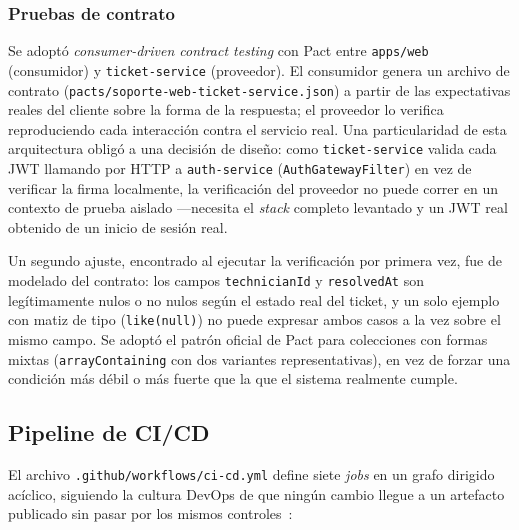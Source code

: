 \subsubsection{Pruebas de contrato}

Se adoptó \emph{consumer-driven contract testing} con Pact entre \texttt{apps/web} (consumidor) y
\texttt{ticket-service} (proveedor). El consumidor genera un archivo de contrato
(\texttt{pacts/soporte-web-ticket-service.json}) a partir de las expectativas reales del cliente
sobre la forma de la respuesta; el proveedor lo verifica reproduciendo cada interacción contra el
servicio real. Una particularidad de esta arquitectura obligó a una decisión de diseño: como
\texttt{ticket-service} valida cada JWT llamando por HTTP a \texttt{auth-service}
(\texttt{AuthGatewayFilter}) en vez de verificar la firma localmente, la verificación del
proveedor no puede correr en un contexto de prueba aislado —necesita el \emph{stack} completo
levantado y un JWT real obtenido de un inicio de sesión real.

Un segundo ajuste, encontrado al ejecutar la verificación por primera vez, fue de modelado del
contrato: los campos \texttt{technicianId} y \texttt{resolvedAt} son legítimamente nulos o no
nulos según el estado real del ticket, y un solo ejemplo con matiz de tipo (\texttt{like(null)})
no puede expresar ambos casos a la vez sobre el mismo campo. Se adoptó el patrón oficial de Pact
para colecciones con formas mixtas (\texttt{arrayContaining} con dos variantes representativas),
en vez de forzar una condición más débil o más fuerte que la que el sistema realmente cumple.

\subsection{Pipeline de CI/CD}

El archivo \texttt{.github/workflows/ci-cd.yml} define siete \emph{jobs} en un grafo dirigido
acíclico, siguiendo la cultura DevOps de que ningún cambio llegue a un artefacto publicado sin
pasar por los mismos controles~\cite{kim2021devops,humble2010continuous}:

